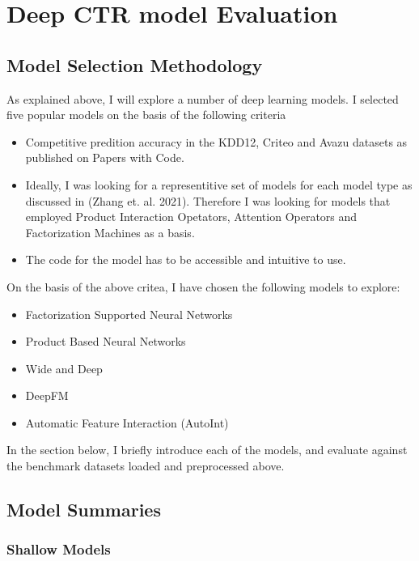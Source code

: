 \documentclass{mldsmsc}
\begin{document}
\chapter{Deep CTR model Evaluation}
\label{chap:deep-ctr-model-evaluation}

\section{Model Selection Methodology}

As explained above, I will explore a number of deep learning models. I selected five popular models on the basis of the following criteria

\begin{itemize}
\item Competitive predition accuracy in the KDD12, Criteo and Avazu datasets as published on Papers with Code.
\item Ideally, I was looking for a representitive set of models for each model type as discussed in (Zhang et. al. 2021). Therefore I was looking for models that employed Product Interaction Opetators, Attention Operators and Factorization Machines as a basis.
\item The code for the model has to be accessible and intuitive to use.
\end{itemize}

On the basis of the above critea, I have chosen the following models to explore:

\begin{itemize}
\item Factorization Supported Neural Networks
\item Product Based Neural Networks
\item Wide and Deep
\item DeepFM
\item Automatic Feature Interaction (AutoInt)
\end{itemize}

In the section below, I briefly introduce each of the models, and evaluate against the benchmark datasets loaded and preprocessed above.

\section{Model Summaries}

\subsection{Shallow Models}
\end{document}
